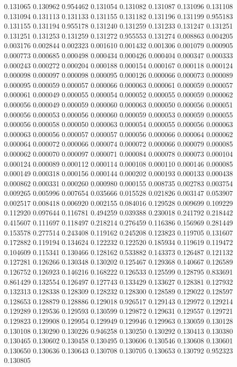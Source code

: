 0.131065
0.130962
0.954462
0.131054
0.131082
0.131087
0.131096
0.131108
0.131094
0.131113
0.131133
0.131155
0.131182
0.131196
0.131199
0.955183
0.131155
0.131194
0.955178
0.131240
0.131259
0.131233
0.131247
0.131251
0.131251
0.131253
0.131259
0.131272
0.955553
0.131274
0.008863
0.004205
0.003176
0.002844
0.002323
0.001610
0.001432
0.001306
0.001079
0.000905
0.000773
0.000685
0.000498
0.000434
0.000426
0.000404
0.000347
0.000333
0.000243
0.000272
0.000204
0.000188
0.000154
0.000167
0.000118
0.000124
0.000098
0.000097
0.000098
0.000095
0.000126
0.000066
0.000073
0.000089
0.000095
0.000059
0.000057
0.000066
0.000063
0.000061
0.000059
0.000057
0.000061
0.000049
0.000055
0.000054
0.000052
0.000055
0.000059
0.000062
0.000056
0.000049
0.000059
0.000060
0.000063
0.000050
0.000056
0.000051
0.000056
0.000053
0.000056
0.000060
0.000059
0.000053
0.000059
0.000055
0.000056
0.000058
0.000050
0.000063
0.000054
0.000055
0.000056
0.000063
0.000063
0.000056
0.000057
0.000057
0.000056
0.000066
0.000064
0.000062
0.000064
0.000072
0.000066
0.000074
0.000072
0.000066
0.000079
0.000085
0.000062
0.000070
0.000097
0.000071
0.000084
0.000078
0.000073
0.000104
0.000124
0.000089
0.000112
0.000114
0.000108
0.000110
0.000146
0.000085
0.000149
0.000318
0.000156
0.000144
0.000202
0.000193
0.000133
0.000438
0.000862
0.000331
0.000260
0.000980
0.000155
0.008735
0.002783
0.003754
0.009265
0.005996
0.007654
0.035666
0.015528
0.021826
0.003147
0.053907
0.002517
0.008418
0.006920
0.002155
0.084016
0.129528
0.009699
0.109229
0.112920
0.097644
0.116781
0.494259
0.039388
0.230018
0.241792
0.218442
0.415607
0.111697
0.118497
0.218214
0.276459
0.116386
0.156969
0.281449
0.153578
0.277514
0.243408
0.119162
0.245208
0.123823
0.119705
0.131607
0.172882
0.119194
0.134624
0.122232
0.122520
0.185934
0.119619
0.119472
0.104609
0.115341
0.130466
0.128162
0.533882
0.143373
0.126487
0.121132
0.127281
0.126266
0.130348
0.130202
0.125467
0.129368
0.140667
0.126589
0.126752
0.126923
0.146216
0.168222
0.126533
0.125599
0.128795
0.833691
0.861429
0.132554
0.126497
0.127743
0.133429
0.133627
0.128381
0.127932
0.132313
0.128338
0.128309
0.128232
0.128300
0.128589
0.129022
0.128597
0.128653
0.128879
0.128886
0.129018
0.926517
0.129143
0.129972
0.129214
0.129289
0.129536
0.129593
0.130599
0.129872
0.129631
0.129557
0.129721
0.129823
0.129908
0.129954
0.129949
0.129946
0.129963
0.130059
0.130128
0.130108
0.130290
0.130226
0.946258
0.130250
0.130292
0.130413
0.130380
0.130465
0.130602
0.130458
0.130495
0.130606
0.130546
0.130608
0.130601
0.130650
0.130636
0.130643
0.130708
0.130705
0.130653
0.130792
0.952323
0.130805
